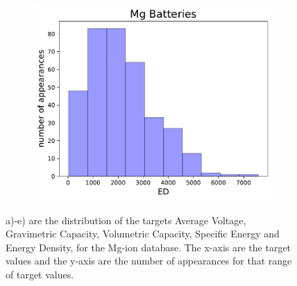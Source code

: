 \begin{figure}[h]
          ~ 
     \begin{subfigure}{0.3\textwidth}
         \centering
         \includegraphics[width=\linewidth]{result/figures/columnsplotMg_ED.pdf}
         \caption{}
     \end{subfigure}
     \caption{a)-e) are the distribution of the targets Average Voltage, Gravimetric Capacity, Volumetric Capacity, Specific Energy and Energy Density, for the Mg-ion database. The x-axis are the target values and the y-axis are the number of appearances for that range of target values.}
     \label{fig:Mg_targets_a-e}
 \end{figure}
